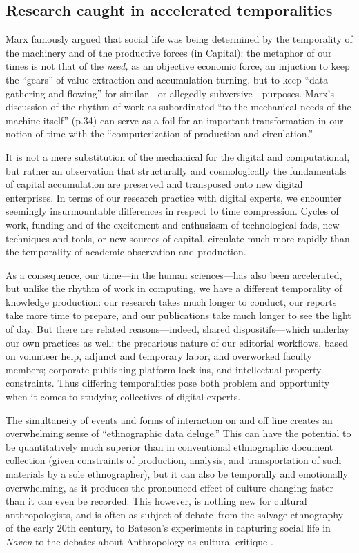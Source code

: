 \documentclass[10pt,letter,oneside]{scrartcl}
\begin{document}
\subsection*{Research caught in accelerated  temporalities} 

Marx famously argued that social life was being determined by the temporality 
of the machinery and of the productive forces (in Capital):
the metaphor of our times is not that of the \emph{need,} as an
objective economic force, an injuction to keep the ``gears'' of
value-extraction and accumulation turning, but to keep ``data
gathering and flowing'' for similar---or allegedly subversive---purposes. 
Marx's discussion of the rhythm of work as subordinated ``to the 
mechanical needs of the machine itself'' \cite{Marx1990} (p.34) can serve 
as a foil for an important transformation in our notion of time with
the ``computerization of production and circulation.'' 

It is not a mere substitution of the mechanical for the digital and
computational, but rather an observation that structurally and
cosmologically the fundamentals of capital accumulation are preserved
and transposed onto new digital enterprises.  In terms of our research
practice with digital experts, we encounter seemingly insurmountable
differences in respect to time compression. Cycles of work, funding
and of the excitement and enthusiasm of technological fads, new
techniques and tools, or new sources of capital, circulate much more
rapidly than the temporality of academic observation and production.

As a consequence, our time---in the human sciences---has also been
accelerated, but unlike the rhythm of work in computing, we
have a different temporality of knowledge production: our research
takes much longer to conduct, our reports take more time to prepare,
and our publications take much longer to see the light of day.  But
there are related reasons---indeed, shared dispositifs---which
underlay our own practices as well: the precarious nature of our
editorial workflows, based on volunteer help, adjunct and temporary
labor, and overworked faculty members; corporate publishing platform
lock-ins, and intellectual property constraints.  Thus differing
temporalities pose both problem and opportunity when it comes to
studying collectives of digital experts.

The simultaneity of events and forms of interaction on and
off line creates an overwhelming sense of ``ethnographic data
deluge.''  This can have the potential to be quantitatively much superior than in
conventional ethnographic document collection (given constraints of
production, analysis, and transportation of such materials by a sole
ethnographer), but it can also be temporally and emotionally
overwhelming, as it produces the pronounced effect of culture changing
faster than it can even be recorded.  This however, is nothing new for
cultural anthropologists, and is often as subject of debate--from the
salvage ethnography of the early 20th century, to Bateson's
experiments in capturing social life in \emph{Naven}
\cite{Naven,MarcusOnNaven} to the debates about Anthropology as
cultural critique \cite{MarcusFischer,WritingCulture}.
\end{document}
